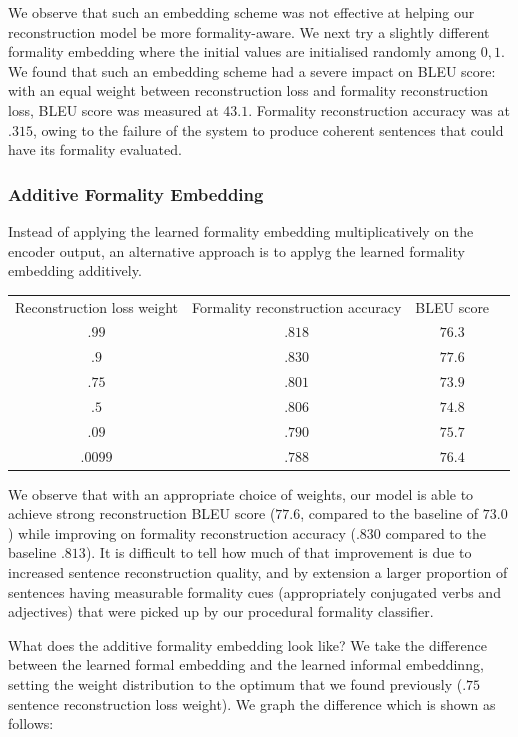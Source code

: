\documentclass[11pt]{article}
\begin{document}
We observe that such an embedding scheme was not effective at helping our reconstruction model be more formality-aware. We next try a slightly different formality embedding where the initial values are initialised randomly among ${0, 1}$. We found that such an embedding scheme had a severe impact on BLEU score: with an equal weight between reconstruction loss and formality reconstruction loss, BLEU score was measured at $43.1$. Formality reconstruction accuracy was at $.315$, owing to the failure of the system to produce coherent sentences that could have its formality evaluated. 

\subsubsection{Additive Formality Embedding}

Instead of applying the learned formality embedding multiplicatively on the encoder output, an alternative approach is to applyg the learned formality embedding additively. 

\begin{tabular}{ c c c c }
    Reconstruction loss weight & Formality reconstruction accuracy & BLEU score \\
    $.99$ & $.818$ & $76.3$ \\
    $.9$ & $.830$ & $77.6$ \\
    $.75$ & $.801$ & $73.9$ \\
    $.5$ & $.806$ & $74.8$ \\
    $.09$ & $.790$ & $75.7$ \\
    $.0099$ & $.788$ & $76.4$ \\
\end{tabular}

We observe that with an appropriate choice of weights, our model is able to achieve strong reconstruction BLEU score ($77.6$, compared to the baseline of $73.0$) while improving on formality reconstruction accuracy ($.830$ compared to the baseline $.813$). It is difficult to tell how much of that improvement is due to increased sentence reconstruction quality, and by extension a larger proportion of sentences having measurable formality cues (appropriately conjugated verbs and adjectives) that were picked up by our procedural formality classifier.

What does the additive formality embedding look like? We take the difference between the learned formal embedding and the learned informal embeddinng, setting the weight distribution to the optimum that we found previously ($.75$ sentence reconstruction loss weight). We graph the difference which is shown as follows:
\end{document}
